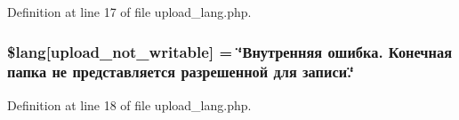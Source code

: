Definition at line 17 of file upload\+\_\+lang.\+php.

\subsubsection[{\texorpdfstring{\$lang}{$lang}}]{\setlength{\rightskip}{0pt plus 5cm}\$lang\mbox{[}\textquotesingle{}upload\+\_\+not\+\_\+writable\textquotesingle{}\mbox{]} = \char`\"{}Внутренняя ошибка. Конечная папка не представляется разрешенной для записи.\char`\"{}}\hypertarget{application_2language_2russian_2upload__lang_8php_aed6bfb5a9094179427f61fcbb582145b}{}\label{application_2language_2russian_2upload__lang_8php_aed6bfb5a9094179427f61fcbb582145b}


Definition at line 18 of file upload\+\_\+lang.\+php.

